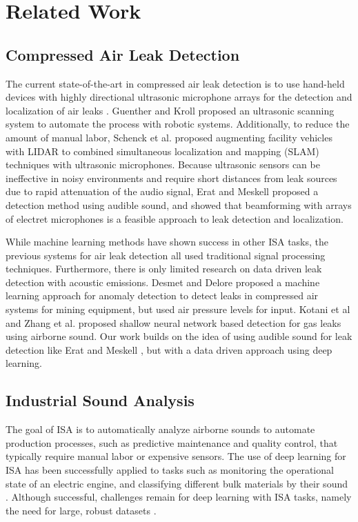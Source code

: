 \section{Related Work}\label{sec:rw}

\subsection{Compressed Air Leak Detection}

The current state-of-the-art in compressed air leak detection is to use hand-held devices with highly directional ultrasonic microphone arrays for the detection and localization of air leaks \cite{Murvay2012:survey, Steckel2014:local}. Guenther and Kroll \cite{Guenther2016:ultrasonic} proposed an ultrasonic scanning system to automate the process with robotic systems.
Additionally, to reduce the amount of manual labor, Schenck et al. \cite{Schenck2019:airleakslam} proposed augmenting facility vehicles with LIDAR to combined simultaneous localization and mapping (SLAM) techniques with ultrasonic microphones.
Because ultrasonic sensors can be ineffective in noisy environments and require short distances from leak sources due to rapid attenuation of the audio signal, Erat and Meskell \cite{Eret2012:beamform} proposed a detection method using audible sound, and showed that beamforming with arrays of electret microphones is a feasible approach to leak detection and localization. 

While machine learning methods have shown success in other ISA tasks, the previous systems for air leak detection all used traditional signal processing techniques. Furthermore, there is only limited research on data driven leak detection with acoustic emissions. Desmet and Delore \cite{Desmet2017:ad} proposed a machine learning approach for anomaly detection to detect leaks in compressed air systems for mining equipment, but used air pressure levels for input. Kotani et al \cite{Kotani.2004} and Zhang et al. \cite{Zhang2003} proposed shallow neural network based detection for gas leaks using airborne sound. Our work builds on the idea of using audible sound for leak detection like Erat and Meskell \cite{Eret2012:beamform}, but with a data driven approach using deep learning.

\subsection{Industrial Sound Analysis}

The goal of ISA is to automatically analyze airborne sounds to automate production processes, such as predictive maintenance and quality control, that typically require manual labor or expensive sensors. The use of deep learning for ISA has been successfully applied to tasks such as monitoring the operational state of an electric engine, and classifying different bulk materials by their sound \cite{Grollmisch2019:isa, Grollmisch2020:embeddings}. Although successful, challenges remain for deep learning with ISA tasks, namely the need for large, robust datasets \cite{Johnson2020:robust}.

